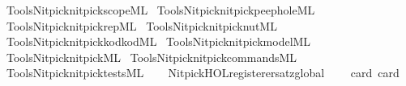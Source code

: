 \begin{isabellebody}
\isamarkupfalse%
\ {\isacartoucheopen}Tools{\isacharslash}{\kern0pt}Nitpick{\isacharslash}{\kern0pt}nitpick{\isacharunderscore}{\kern0pt}scope{\isachardot}{\kern0pt}ML{\isacartoucheclose}\isanewline
{}\isamarkupfalse%
\ {\isacartoucheopen}Tools{\isacharslash}{\kern0pt}Nitpick{\isacharslash}{\kern0pt}nitpick{\isacharunderscore}{\kern0pt}peephole{\isachardot}{\kern0pt}ML{\isacartoucheclose}\isanewline
{}\isamarkupfalse%
\ {\isacartoucheopen}Tools{\isacharslash}{\kern0pt}Nitpick{\isacharslash}{\kern0pt}nitpick{\isacharunderscore}{\kern0pt}rep{\isachardot}{\kern0pt}ML{\isacartoucheclose}\isanewline
{}\isamarkupfalse%
\ {\isacartoucheopen}Tools{\isacharslash}{\kern0pt}Nitpick{\isacharslash}{\kern0pt}nitpick{\isacharunderscore}{\kern0pt}nut{\isachardot}{\kern0pt}ML{\isacartoucheclose}\isanewline
{}\isamarkupfalse%
\ {\isacartoucheopen}Tools{\isacharslash}{\kern0pt}Nitpick{\isacharslash}{\kern0pt}nitpick{\isacharunderscore}{\kern0pt}kodkod{\isachardot}{\kern0pt}ML{\isacartoucheclose}\isanewline
{}\isamarkupfalse%
\ {\isacartoucheopen}Tools{\isacharslash}{\kern0pt}Nitpick{\isacharslash}{\kern0pt}nitpick{\isacharunderscore}{\kern0pt}model{\isachardot}{\kern0pt}ML{\isacartoucheclose}\isanewline
{}\isamarkupfalse%
\ {\isacartoucheopen}Tools{\isacharslash}{\kern0pt}Nitpick{\isacharslash}{\kern0pt}nitpick{\isachardot}{\kern0pt}ML{\isacartoucheclose}\isanewline
{}\isamarkupfalse%
\ {\isacartoucheopen}Tools{\isacharslash}{\kern0pt}Nitpick{\isacharslash}{\kern0pt}nitpick{\isacharunderscore}{\kern0pt}commands{\isachardot}{\kern0pt}ML{\isacartoucheclose}\isanewline
{}\isamarkupfalse%
\ {\isacartoucheopen}Tools{\isacharslash}{\kern0pt}Nitpick{\isacharslash}{\kern0pt}nitpick{\isacharunderscore}{\kern0pt}tests{\isachardot}{\kern0pt}ML{\isacartoucheclose}\isanewline
\isanewline
{}\isamarkupfalse%
\ {\isacartoucheopen}\isanewline
\ \ Nitpick{\isacharunderscore}{\kern0pt}HOL{\isachardot}{\kern0pt}register{\isacharunderscore}{\kern0pt}ersatz{\isacharunderscore}{\kern0pt}global\isanewline
\ \ \ \ {\isacharbrackleft}{\kern0pt}{\isacharparenleft}{\kern0pt}\isactrlconstUNDERSCOREname {\isasymopen}card{\isasymclose}{\isacharcomma}{\kern0pt}\ \isactrlconstUNDERSCOREname {\isasymopen}card{\isacharprime}{\kern0pt}{\isasymclose}{\isacharparenright}{\kern0pt}{\isacharcomma}{\kern0pt}\isanewline

\end{isabellebody}

